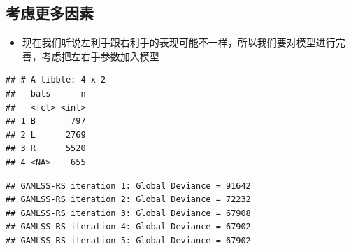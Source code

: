 \documentclass[
]{book}
\newenvironment{Shaded}{\begin{snugshade}}{\end{snugshade}}
\newcommand{\CommentTok}[1]{\textcolor[rgb]{0.56,0.35,0.01}{\textit{#1}}}
\newcommand{\DataTypeTok}[1]{\textcolor[rgb]{0.13,0.29,0.53}{#1}}
\newcommand{\KeywordTok}[1]{\textcolor[rgb]{0.13,0.29,0.53}{\textbf{#1}}}
\newcommand{\NormalTok}[1]{#1}
\newcommand{\OperatorTok}[1]{\textcolor[rgb]{0.81,0.36,0.00}{\textbf{#1}}}
\newcommand{\StringTok}[1]{\textcolor[rgb]{0.31,0.60,0.02}{#1}}
\providecommand{\tightlist}{%
  \setlength{\itemsep}{0pt}\setlength{\parskip}{0pt}}
\begin{document}
\hypertarget{ux8003ux8651ux66f4ux591aux56e0ux7d20}{%
\subsection{考虑更多因素}\label{ux8003ux8651ux66f4ux591aux56e0ux7d20}}

\begin{itemize}
\tightlist
\item
  现在我们听说左利手跟右利手的表现可能不一样，所以我们要对模型进行完善，考虑把左右手参数加入模型
\end{itemize}

\begin{Shaded}
\end{Shaded}

\begin{verbatim}
## # A tibble: 4 x 2
##   bats      n
##   <fct> <int>
## 1 B       797
## 2 L      2769
## 3 R      5520
## 4 <NA>    655
\end{verbatim}

\begin{Shaded}
\end{Shaded}

\begin{verbatim}
## GAMLSS-RS iteration 1: Global Deviance = 91642 
## GAMLSS-RS iteration 2: Global Deviance = 72232 
## GAMLSS-RS iteration 3: Global Deviance = 67908 
## GAMLSS-RS iteration 4: Global Deviance = 67902 
## GAMLSS-RS iteration 5: Global Deviance = 67902
\end{verbatim}
\end{document}
